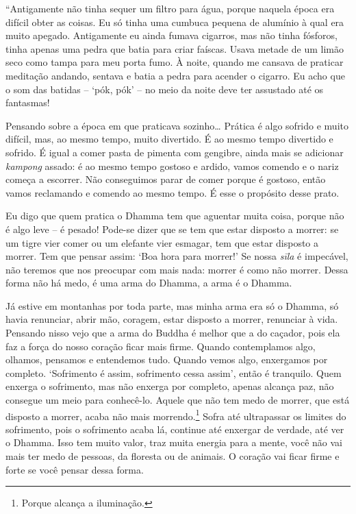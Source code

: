 ``Antigamente não tinha sequer um filtro para água, porque naquela época
era difícil obter as coisas. Eu só tinha uma cumbuca pequena de alumínio
à qual era muito apegado. Antigamente eu ainda fumava cigarros, mas não
tinha fósforos, tinha apenas uma pedra que batia para criar faíscas.
Usava metade de um limão seco como tampa para meu porta fumo. À noite,
quando me cansava de praticar meditação andando, sentava e batia a pedra
para acender o cigarro. Eu acho que o som das batidas -- `pók, pók' --
no meio da noite deve ter assustado até os fantasmas!

Pensando sobre a época em que praticava sozinho\ldots{} Prática é algo
sofrido e muito difícil, mas, ao mesmo tempo, muito divertido. É ao
mesmo tempo divertido e sofrido. É igual a comer pasta de pimenta com
gengibre, ainda mais se adicionar \emph{kampong} assado: é ao mesmo
tempo gostoso e ardido, vamos comendo e o nariz começa a escorrer. Não
conseguimos parar de comer porque é gostoso, então vamos reclamando e
comendo ao mesmo tempo. É esse o propósito desse prato.

Eu digo que quem pratica o Dhamma tem que aguentar muita coisa, porque
não é algo leve -- é pesado! Pode-se dizer que se tem que estar disposto
a morrer: se um tigre vier comer ou um elefante vier esmagar, tem que
estar disposto a morrer. Tem que pensar assim: `Boa hora para morrer!'
Se nossa \emph{sīla} é impecável, não teremos que nos preocupar com mais
nada: morrer é como não morrer. Dessa forma não há medo, é uma arma do
Dhamma, a arma é o Dhamma.

Já estive em montanhas por toda parte, mas minha arma era só o Dhamma,
só havia renunciar, abrir mão, coragem, estar disposto a morrer,
renunciar à vida. Pensando nisso vejo que a arma do Buddha é melhor que
a do caçador, pois ela faz a força do nosso coração ficar mais firme.
Quando contemplamos algo, olhamos, pensamos e entendemos tudo. Quando
vemos algo, enxergamos por completo. `Sofrimento é assim, sofrimento
cessa assim', então é tranquilo. Quem enxerga o sofrimento, mas não
enxerga por completo, apenas alcança paz, não consegue um meio para
conhecê-lo. Aquele que não tem medo de morrer, que está disposto a
morrer, acaba não mais morrendo.\footnote{Porque alcança a iluminação.}
Sofra até ultrapassar os limites do sofrimento, pois o sofrimento acaba
lá, continue até enxergar de verdade, até ver o Dhamma. Isso tem muito
valor, traz muita energia para a mente, você não vai mais ter medo de
pessoas, da floresta ou de animais. O coração vai ficar firme e forte se
você pensar dessa forma.

